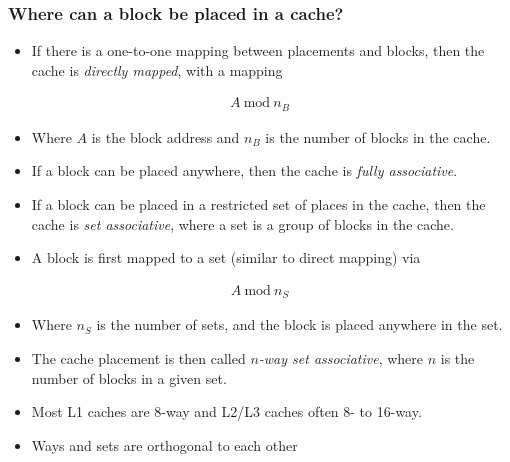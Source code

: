 \subsubsection{Where can a block be placed in a cache?}
\begin{itemize}
  \item If there is a one-to-one mapping between placements and blocks, then the cache is \textit{directly mapped}, with a mapping 
\end{itemize}
\begin{align}
  A\ \text{mod}\ n_B
\end{align}
\begin{itemize}
  \item Where $A$ is the block address and $n_B$ is the number of blocks in the cache.
  \item If a block can be placed anywhere, then the cache is \textit{fully associative}.
  \item If a block can be placed in a restricted set of places in the cache, then the cache is \textit{set associative}, where a set is a group of blocks in the cache.
  \item A block is first mapped to a set (similar to direct mapping) via 
\end{itemize}
\begin{align}
  A\ \text{mod}\ n_S
\end{align}
\begin{itemize}
  \item Where $n_S$ is the number of sets, and the block is placed anywhere in the set. 
  \item The cache placement is then called $n$\textit{-way set associative}, where $n$ is the number of blocks in a given set.
  \item Most L1 caches are 8-way and L2/L3 caches often 8- to 16-way.
  \item Ways and sets are orthogonal to each other
\end{itemize}
